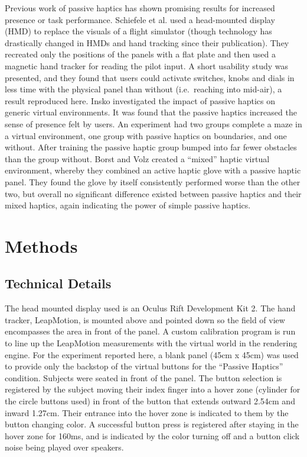 \documentclass[]{aiaa-tc}%
\begin{document}
Previous work of passive haptics has shown promising results for increased presence or task performance.
Schiefele et al.\cite{schiefele_simple_1998} used a head-mounted display (HMD) to replace the visuals of a flight simulator (though technology has drastically changed in HMDs and hand tracking since their publication).
They recreated only the positions of the panels with a flat plate and then used a magnetic hand tracker for reading the pilot input.
A short usability study was presented, and they found that users could activate switches, knobs and dials in less time with the physical panel than without (i.e.\ reaching into mid-air), a result reproduced here.
Insko\cite{insko_passive_2001} investigated the impact of passive haptics on generic virtual environments.
It was found that the passive haptics increased the sense of presence felt by users.
An experiment had two groups complete a maze in a virtual environment, one group with passive haptics on boundaries, and one without.
After training the passive haptic group bumped into far fewer obstacles than the group without.
Borst and Volz\cite{borst_evaluation_2005} created a ``mixed'' haptic virtual environment, whereby they combined an active haptic glove with a passive haptic panel.
They found the glove by itself consistently performed worse than the other two, but overall no significant difference existed between passive haptics and their mixed haptics, again indicating the power of simple passive haptics.

\section{Methods}
\subsection{Technical Details}
The head mounted display used is an Oculus Rift Development Kit 2.
The hand tracker, LeapMotion, is mounted above and pointed down so the field of view encompasses the area in front of the panel.
A custom calibration program is run to line up the LeapMotion measurements with the virtual world in the rendering engine.
For the experiment reported here, a blank panel (45cm x 45cm) was used to provide only the backstop of the virtual buttons for the ``Passive Haptics'' condition.
Subjects were seated in front of the panel.
The button selection is registered by the subject moving their index finger into a hover zone (cylinder for the circle buttons used) in front of the button that extends outward 2.54cm and inward 1.27cm.
Their entrance into the hover zone is indicated to them by the button changing color.
A successful button press is registered after staying in the hover zone for 160ms, and is indicated by the color turning off and a button click noise being played over speakers.
\end{document}
